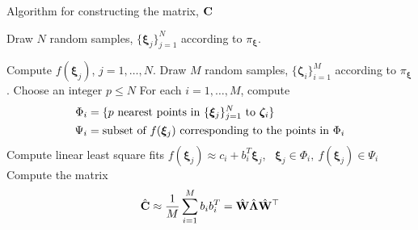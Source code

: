 %
\bigskip
\begin{breakablealgorithm}
\renewcommand{\algorithmicrequire}{\textbf{Input:}}
\renewcommand{\algorithmicensure}{\textbf{Output:}}
  \caption{Algorithm for constructing the matrix, $\mathbf{{C}}$}
  \begin{algorithmic}[1]
	\State Draw $N$ random samples, $\{\bm{\xi}_j\}_{j=1}^{N}$ 
	according to $\pi_{\bm{\xi}}$.

	\State Compute $f(\bm\xi_j)$, $j=1, \ldots, N$.
	\State Draw $M$ random samples, $\{\bm{\zeta}_i\}_{i=1}^{M}$
	according to $\pi_{\bm{\xi}}$.
	\State Choose an integer $p \leq N$ 
	\State For each $i=1, \ldots, M$, compute 
	\[
	\begin{aligned}
	\Phi_i &= \{ p \text{ nearest points in } \{\bm{\xi}_j\}_{j=1}^{N} \text{ to } \bm{\zeta}_i\}\\
	\vspace{-2mm}
	\Psi_i &= \text{subset of } f(\bm\xi_j) \text{ corresponding to the points in } \Phi_i
	\end{aligned}
	\]
	\State Compute linear least square fits 
	 $f(\bm\xi_j) \approx c_i + b_i^T\bm{\xi}_j$, \  $\bm{\xi}_j \in \Phi_i, \ f(\bm\xi_j) \in \Psi_i$
	\State Compute the matrix 
	\[
	\hat{\mathbf{{C}}} \approx \frac{1}{M} \sum_{i=1}^{M} b_i b_i^T = \hat{\mathbf{{W}}}\hat{\mathbf{{\Lambda}}}\hat{\mathbf{{W}}}^\top
	\]
	\EndProcedure
  \end{algorithmic}
  \label{alg:free2}
\end{breakablealgorithm}
\bigskip



